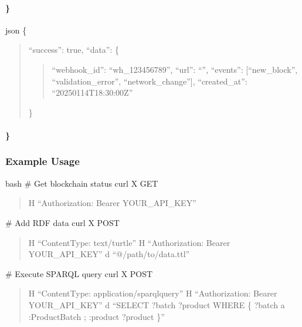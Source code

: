 \documentclass[letterpaper,10pt,english]{sphinxmanual}
\begin{document}
\paragraph{\}}
\label{\detokenize{api/rest-api:id89}}
\sphinxAtStartPar
{}
{\color{red}\bfseries{}\textasciigrave{}\textasciigrave{}}{\color{red}\bfseries{}\textasciigrave{}}json
\{
\begin{quote}

\sphinxAtStartPar
“success”: true,
“data”: \{
\begin{quote}

\sphinxAtStartPar
“webhook\_id”: “wh\_123456789”,
“url”: “”,
“events”: {[}“new\_block”, “validation\_error”, “network\_change”{]},
“created\_at”: “2025\sphinxhyphen{}01\sphinxhyphen{}14T18:30:00Z”
\end{quote}

\sphinxAtStartPar
\}
\end{quote}


\paragraph{\}}
\label{\detokenize{api/rest-api:id94}}

\subsubsection{Example Usage}
\label{\detokenize{api/rest-api:example-usage}}
\sphinxAtStartPar
{\color{red}\bfseries{}\textasciigrave{}\textasciigrave{}}{\color{red}\bfseries{}\textasciigrave{}}bash
\# Get blockchain status
curl \sphinxhyphen{}X GET  
\begin{quote}

\sphinxAtStartPar
\sphinxhyphen{}H “Authorization: Bearer YOUR\_API\_KEY”
\end{quote}

\sphinxAtStartPar
\# Add RDF data
curl \sphinxhyphen{}X POST  
\begin{quote}

\sphinxAtStartPar
\sphinxhyphen{}H “Content\sphinxhyphen{}Type: text/turtle” \sphinxhyphen{}H “Authorization: Bearer YOUR\_API\_KEY” \sphinxhyphen{}d “@/path/to/data.ttl”
\end{quote}

\sphinxAtStartPar
\# Execute SPARQL query
curl \sphinxhyphen{}X POST  
\begin{quote}

\sphinxAtStartPar
\sphinxhyphen{}H “Content\sphinxhyphen{}Type: application/sparql\sphinxhyphen{}query” \sphinxhyphen{}H “Authorization: Bearer YOUR\_API\_KEY” \sphinxhyphen{}d “SELECT ?batch ?product WHERE \{ ?batch a :ProductBatch ; :product ?product \}”
\end{quote}
\end{document}
